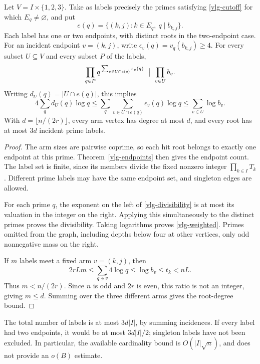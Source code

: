 \begin{theorem}
\label{vlg-packets}
Let \(V=I\times\{1,2,3\}\). Take as labels precisely the primes
satisfying \eqref{vlg-cutoff} for which \(E_q\ne\varnothing\), and put
\[
 e(q)=\{(k,j):k\in E_q,\ q\mid b_{k,j}\}.
\]
Each label has one or two endpoints, with distinct roots in the
two-endpoint case. For an incident endpoint \(v=(k,j)\), write
\(\epsilon_v(q)=v_q(b_{k,j})\geq4\).
For every subset \(U\subseteq V\) and every subset \(P\) of the labels,
\begin{equation}\label{vlg-divisibility}
 \prod_{q\in P}q^{\,\sum_{v\in U\cap e(q)}\epsilon_v(q)}
       \ \bigm|\ \prod_{v\in U}b_v.
\end{equation}
Writing \(d_U(q)=|U\cap e(q)|\), this implies
\begin{equation}\label{vlg-weighted}
 4\sum_q d_U(q)\log q
 \leq\sum_q\sum_{v\in U\cap e(q)}\epsilon_v(q)\log q
 \leq\sum_{v\in U}\log b_v.
\end{equation}
With \(d=\lfloor n/(2r)\rfloor\), every arm vertex has degree at most
\(d\), and every root has at most \(3d\) incident prime labels.
\end{theorem}
\begin{proof}
The arm sizes are pairwise coprime, so each hit root belongs to
exactly one endpoint at this prime. Theorem~\ref{vlg-endpoints}
then gives the endpoint count. The label set is finite, since its
members divide the fixed nonzero integer \(\prod_{k\in I}T_k\).
Different prime labels may have the same endpoint set, and singleton
edges are allowed.

For each prime \(q\), the exponent on the left of
\eqref{vlg-divisibility} is at most its valuation in the integer on
the right. Applying this simultaneously to the distinct primes
proves the divisibility. Taking logarithms proves
\eqref{vlg-weighted}. Primes omitted from the graph, including
depths below four at other vertices, only add nonnegative mass on
the right.

If \(m\) labels meet a fixed arm \(v=(k,j)\), then
\[
 2rLm\leq\sum_{q\ni v}4\log q
       \leq\log b_v\leq t_k<nL.
\]
Thus \(m<n/(2r)\). Since \(n\) is odd and \(2r\) is even, this
ratio is not an integer, giving \(m\leq d\). Summing over the
three different arms gives the root-degree bound.
\end{proof}

The total number of labels is at most \(3d|I|\), by summing
incidences. If every label had two endpoints, it would be at most
\(3d|I|/2\); singleton labels have not been excluded. In particular,
the available cardinality bound is \(O(|I|\sqrt n)\), and does not
provide an \(o(B)\) estimate.

